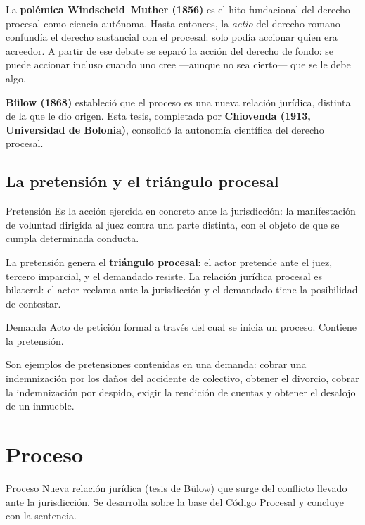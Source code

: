 \documentclass[12pt,oneside]{book}
\begin{document}
La \textbf{polémica Windscheid--Muther (1856)} es el hito fundacional del derecho procesal como ciencia autónoma. Hasta entonces, la \textit{actio} del derecho romano confundía el derecho sustancial con el procesal: solo podía accionar quien era acreedor. A partir de ese debate se separó la acción del derecho de fondo: se puede accionar incluso cuando uno cree ---aunque no sea cierto--- que se le debe algo.

\textbf{Bülow (1868)} estableció que el proceso es una nueva relación jurídica, distinta de la que le dio origen. Esta tesis, completada por \textbf{Chiovenda (1913, Universidad de Bolonia)}, consolidó la autonomía científica del derecho procesal.

\subsection{La pretensión y el triángulo procesal}

\begin{definicion}{Pretensión}
Es la acción ejercida en concreto ante la jurisdicción: la manifestación de voluntad dirigida al juez contra una parte distinta, con el objeto de que se cumpla determinada conducta.
\end{definicion}

La pretensión genera el \textbf{triángulo procesal}: el actor pretende ante el juez, tercero imparcial, y el demandado resiste. La relación jurídica procesal es bilateral: el actor reclama ante la jurisdicción y el demandado tiene la posibilidad de contestar.

\begin{definicion}{Demanda}
Acto de petición formal a través del cual se inicia un proceso. Contiene la pretensión.
\end{definicion}

Son ejemplos de pretensiones contenidas en una demanda: cobrar una indemnización por los daños del accidente de colectivo, obtener el divorcio, cobrar la indemnización por despido, exigir la rendición de cuentas y obtener el desalojo de un inmueble.

\section{Proceso}

\begin{definicion}{Proceso}
Nueva relación jurídica (tesis de Bülow) que surge del conflicto llevado ante la jurisdicción. Se desarrolla sobre la base del Código Procesal y concluye con la sentencia.
\end{definicion}
\end{document}
